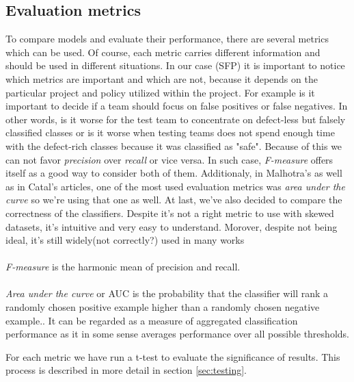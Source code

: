 \subsection{Evaluation metrics}
To compare models and evaluate their performance, there are several metrics which can be used. Of course, each metric carries different information and should be used in different situations. In our case (SFP) it is important to notice which metrics are important and which are not, because it depends on the particular project and policy utilized within the project.
For example is it important to decide if a team should focus on false positives or false negatives. In other words, is it worse for the test team to concentrate on defect-less but falsely classified classes or is it worse when testing teams does not spend enough time with the defect-rich classes because it was classified as "safe". Because of this we can not favor \textit{precision} over \textit{recall} or vice versa. In such case, \textit{F-measure} offers itself as a good way to consider both of them. Additionaly, in Malhotra's \cite{malhotra2015systematic} as well as in Catal's\cite{catal2012performance} articles, one of the most used evaluation metrics was \textit{area under the curve} so we're using that one as well. At last, we've also decided to compare the correctness of the classifiers. Despite it's not a right metric to use\cite{sankar2014prediction,catal2012performance} with skewed datasets, it's intuitive and very easy to understand. Morover, despite not being ideal, it's still widely(not correctly?) used in many works\cite{sahana2013software,prasad2015study,sharma2016software} \\\\
\textit{F-measure} is the harmonic mean of precision and recall.\cite{malhotra2015systematic}\\\\
\textit{Area under the curve} or AUC is the probability that the classifier will rank a randomly chosen positive example higher than a randomly chosen negative example.\cite{japkowicz2011evaluating}. It can be regarded as a measure of aggregated classification performance as it in some sense averages performance over all possible thresholds\cite{dejaeger2013toward}. 

For each metric we have run a t-test to evaluate the significance of results. This process is described in more detail in section \ref{sec:testing}. 